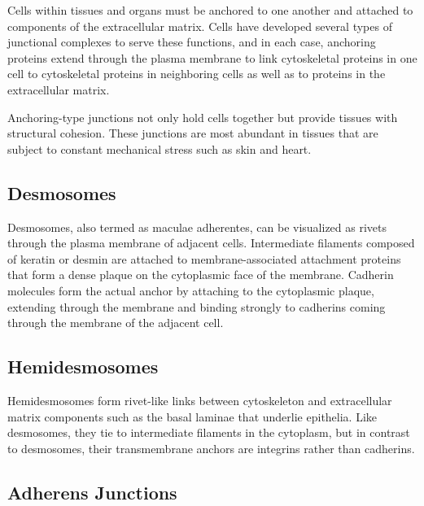 \documentclass[
]{book}
\begin{document}
Cells within tissues and organs must be anchored to one another and attached to components of the extracellular matrix. Cells have developed several types of junctional complexes to serve these functions, and in each case, anchoring proteins extend through the plasma membrane to link cytoskeletal proteins in one cell to cytoskeletal proteins in neighboring cells as well as to proteins in the extracellular matrix.

Anchoring-type junctions not only hold cells together but provide tissues with structural cohesion. These junctions are most abundant in tissues that are subject to constant mechanical stress such as skin and heart.

\hypertarget{desmosomes}{%
\subsection{Desmosomes}\label{desmosomes}}

Desmosomes, also termed as maculae adherentes, can be visualized as rivets through the plasma membrane of adjacent cells. Intermediate filaments composed of keratin or desmin are attached to membrane-associated attachment proteins that form a dense plaque on the cytoplasmic face of the membrane. Cadherin molecules form the actual anchor by attaching to the cytoplasmic plaque, extending through the membrane and binding strongly to cadherins coming through the membrane of the adjacent cell.

\hypertarget{hemidesmosomes}{%
\subsection{Hemidesmosomes}\label{hemidesmosomes}}

Hemidesmosomes form rivet-like links between cytoskeleton and extracellular matrix components such as the basal laminae that underlie epithelia. Like desmosomes, they tie to intermediate filaments in the cytoplasm, but in contrast to desmosomes, their transmembrane anchors are integrins rather than cadherins.

\hypertarget{adherens-junctions}{%
\subsection{Adherens Junctions}\label{adherens-junctions}}
\end{document}
